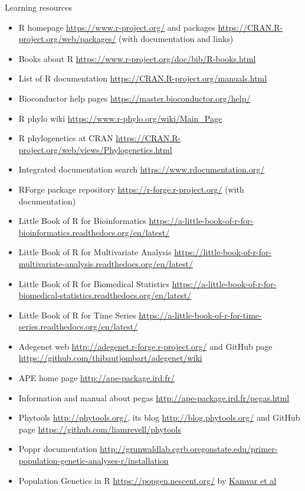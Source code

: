 \documentclass[compress, ucs, xelatex, 11pt, xcolor=svgnames,
	hyperref={
		bookmarks=true,
		unicode=true,
		colorlinks=true,
		pdftitle={Molecular data in R},
		plainpages=false,
		pdfauthor={Vojtech Zeisek},
		pdfsubject={Course about phylogeny and evolution in R},
		pdfcreator={XeLaTeX},
		pdfkeywords={R, evolution, phylogeny, molecular data},
		linkcolor=Tomato,
		anchorcolor=SaddleBrown,
		citecolor=Goldenrod,
		filecolor=DarkMagenta,
		menucolor=Sienna,
		urlcolor=DarkTurquoise,
		pdftex},
	url={hyphens, lowtilde} %
	]{beamer}
\begin{document}
\begin{frame}[allowframebreaks]{Learning resources}
	\begin{itemize}
		\item R homepage \url{https://www.r-project.org/} and packages \url{https://CRAN.R-project.org/web/packages/} (with documentation and links)
		\item Books about R \url{https://www.r-project.org/doc/bib/R-books.html}
		\item List of R documentation \url{https://CRAN.R-project.org/manuals.html}
		\item Bioconductor help pages \url{https://master.bioconductor.org/help/}
		\item R phylo wiki \url{https://www.r-phylo.org/wiki/Main_Page}
		\item R phylogenetics at CRAN \url{https://CRAN.R-project.org/web/views/Phylogenetics.html}
		\item Integrated documentation search \url{https://www.rdocumentation.org/}
		\item RForge package repository \url{https://r-forge.r-project.org/} (with documentation)
		\item Little Book of R for Bioinformatics \url{https://a-little-book-of-r-for-bioinformatics.readthedocs.org/en/latest/}
		\item Little Book of R for Multivariate Analysis \url{https://little-book-of-r-for-multivariate-analysis.readthedocs.org/en/latest/}
		\item Little Book of R for Biomedical Statistics \url{https://a-little-book-of-r-for-biomedical-statistics.readthedocs.org/en/latest/}
		\item Little Book of R for Time Series \url{https://a-little-book-of-r-for-time-series.readthedocs.org/en/latest/}
		\item Adegenet web \url{http://adegenet.r-forge.r-project.org/} and GitHub page \url{https://github.com/thibautjombart/adegenet/wiki}
		\item APE home page \url{http://ape-package.ird.fr/}
		\item Information and manual about pegas \url{http://ape-package.ird.fr/pegas.html}
		\item Phytools \url{http://phytools.org/}, its blog \url{http://blog.phytools.org/} and GitHub page \url{https://github.com/liamrevell/phytools}
		\item Poppr documentation \url{http://grunwaldlab.cgrb.oregonstate.edu/primer-population-genetic-analyses-r/installation}
		\item Population Genetics in R \url{https://popgen.nescent.org/} by \href{https://onlinelibrary.wiley.com/doi/full/10.1111/1755-0998.12558}{Kamvar et al}

\end{itemize}
\end{frame}
\end{document}
